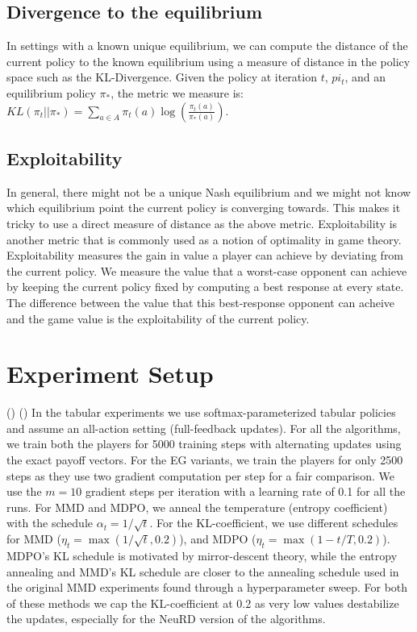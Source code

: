 \subsection{Divergence to the equilibrium}
In settings with a known unique equilibrium, we can compute the distance of the current policy to
the known equilibrium using a measure of distance in the policy space such as the KL-Divergence.
Given the policy at iteration $t$, $pi_t$, and an equilibrium policy $\pi_*$, the metric we measure
is: $KL(\pi_t || \pi_*) = \sum_{a \in A} \pi_t(a) \log \left( \frac{\pi_t(a)}{\pi_*(a)} \right)$.

\subsection{Exploitability}
In general, there might not be a unique Nash equilibrium and we might not know which equilibrium
point the current policy is converging towards.
This makes it tricky to use a direct measure of distance as the above metric.
Exploitability is another metric that is commonly used as a notion of optimality in game theory.
Exploitability measures the gain in value a player can achieve by deviating from the current
policy.
We measure the value that a worst-case opponent can achieve by keeping the current policy fixed by
computing a best response at every state.
The difference between the value that this best-response opponent can acheive and the game value is
the exploitability of the current policy.


\section{Experiment Setup}
 ()
 ()
In the tabular experiments we use softmax-parameterized tabular policies and assume an all-action setting (full-feedback updates).
For all the algorithms, we train both the players for 5000 training steps with alternating updates
using the exact payoff vectors.
For the EG variants, we train the players for only 2500 steps as they use two gradient computation
per step for a fair comparison.
We use the $m=10$ gradient steps per iteration with a learning rate of 0.1 for all the runs.
For MMD and MDPO, we anneal the temperature (entropy coefficient) with the schedule $\alpha_t =
	1/\sqrt{t}$.
For the KL-coefficient, we use different schedules for MMD ($\eta_t = \max(1 / \sqrt{t}, 0.2)$),
and MDPO ($\eta_t = \max(1 - t/T, 0.2)$).
MDPO's KL schedule is motivated by mirror-descent theory, while the entropy annealing and MMD's KL
schedule are closer to the annealing schedule used in the original MMD experiments found through a
hyperparameter sweep.
For both of these methods we cap the KL-coefficient at 0.2 as very low values destabilize the
updates, especially for the NeuRD version of the algorithms.

